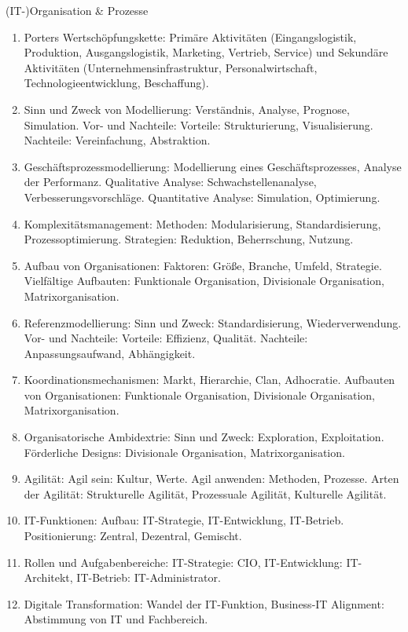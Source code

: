 \documentclass{article}
\begin{document}
\begin{exercise}{(IT-)Organisation \& Prozesse}
  \begin{solution}
    \begin{enumerate}
      \item Porters Wertschöpfungskette: Primäre Aktivitäten (Eingangslogistik, Produktion, Ausgangslogistik, Marketing, Vertrieb, Service) und Sekundäre Aktivitäten (Unternehmensinfrastruktur, Personalwirtschaft, Technologieentwicklung, Beschaffung).
      \item Sinn und Zweck von Modellierung: Verständnis, Analyse, Prognose, Simulation. Vor- und Nachteile: Vorteile: Strukturierung, Visualisierung. Nachteile: Vereinfachung, Abstraktion.
      \item Geschäftsprozessmodellierung: Modellierung eines Geschäftsprozesses, Analyse der Performanz. Qualitative Analyse: Schwachstellenanalyse, Verbesserungsvorschläge. Quantitative Analyse: Simulation, Optimierung.
      \item Komplexitätsmanagement: Methoden: Modularisierung, Standardisierung, Prozessoptimierung. Strategien: Reduktion, Beherrschung, Nutzung.
      \item Aufbau von Organisationen: Faktoren: Größe, Branche, Umfeld, Strategie. Vielfältige Aufbauten: Funktionale Organisation, Divisionale Organisation, Matrixorganisation.
      \item Referenzmodellierung: Sinn und Zweck: Standardisierung, Wiederverwendung. Vor- und Nachteile: Vorteile: Effizienz, Qualität. Nachteile: Anpassungsaufwand, Abhängigkeit.
      \item Koordinationsmechanismen: Markt, Hierarchie, Clan, Adhocratie. Aufbauten von Organisationen: Funktionale Organisation, Divisionale Organisation, Matrixorganisation.
      \item Organisatorische Ambidextrie: Sinn und Zweck: Exploration, Exploitation. Förderliche Designs: Divisionale Organisation, Matrixorganisation.
      \item Agilität: Agil sein: Kultur, Werte. Agil anwenden: Methoden, Prozesse. Arten der Agilität: Strukturelle Agilität, Prozessuale Agilität, Kulturelle Agilität.
      \item IT-Funktionen: Aufbau: IT-Strategie, IT-Entwicklung, IT-Betrieb. Positionierung: Zentral, Dezentral, Gemischt.
      \item Rollen und Aufgabenbereiche: IT-Strategie: CIO, IT-Entwicklung: IT-Architekt, IT-Betrieb: IT-Administrator.
      \item Digitale Transformation: Wandel der IT-Funktion, Business-IT Alignment: Abstimmung von IT und Fachbereich.
    \end{enumerate}
  \end{solution}
\end{exercise}
\end{document}
